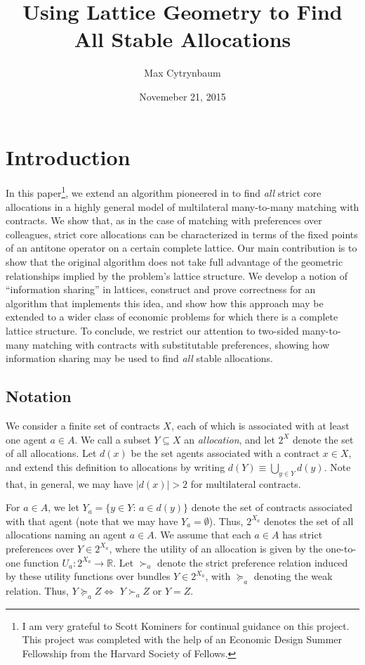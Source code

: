 \documentclass[11pt,reqno]{amsart}
\date{Novemeber 21, 2015}
\title{Using Lattice Geometry to Find All Stable Allocations}
\author{Max Cytrynbaum}
\theoremstyle{definition}
\numberwithin{equation}{section}
\newcommand{\mr}{\mathbb{R}}
\newcommand{\sub}{\subseteq}
\newcommand{\suq}{\succeq}
\newcommand{\su}{\succ}
\begin{document}
\maketitle

\section{Introduction}

In this paper\footnote{I am very grateful to Scott Kominers for continual guidance on this project. This project was completed with the help of an Economic Design Summer Fellowship from the Harvard Society of Fellows.}, we extend an algorithm pioneered in \cite{EcheniqueYenmez2013} to find \emph{all} strict core allocations in a highly general model of multilateral many-to-many matching with contracts.
We show that, as in the case of matching with preferences over colleagues, strict core allocations can be characterized in terms of the fixed points of an antitone operator on a certain complete lattice.
Our main contribution is to show that the original algorithm does not take full advantage of the geometric relationships implied by the problem's lattice structure.
We develop a notion of ``information sharing'' in lattices, construct and prove correctness for an algorithm that implements this idea, and show how this approach may be extended to a wider class of economic problems for which there is a complete lattice structure. 
To conclude, we restrict our attention to two-sided many-to-many matching with contracts with substitutable preferences, showing how information sharing may be used to find \emph{all} stable allocations.

\subsection{Notation}
We consider a finite set of contracts $X$, each of which is associated with at least one agent $a\in A$. 
We call a subset $Y\sub X$ an \emph{allocation}, and let $2^X$ denote the set of all allocations. 
Let $d(x)$ be the set agents associated with a contract $x\in X$, and extend this definition to allocations by writing $d(Y) \equiv \bigcup_{y\in Y} d(y)$.
Note that, in general, we may have $|d(x)| > 2$ for multilateral contracts.

For $a\in A$, we let $Y_a = \{y\in Y: \, a\in d(y)\}$ denote the set of contracts associated with that agent (note that we may have $Y_a = \emptyset$). Thus, $2^{X_a}$ denotes the set of all allocations naming an agent $a\in A$. 
We assume that each $a\in A$ has strict preferences over $Y \in 2^{X_a}$, where the utility of an allocation is given by the one-to-one function $U_a: 2^{X_a} \to \mr$.
Let $\su_a$ denote the strict preference relation induced by these utility functions over bundles $Y \in 2^{X_a}$, with $\suq_a$ denoting the weak relation. Thus, $Y \suq_a  Z \iff$ $Y \su_a Z$ or $Y = Z$.
\end{document}
